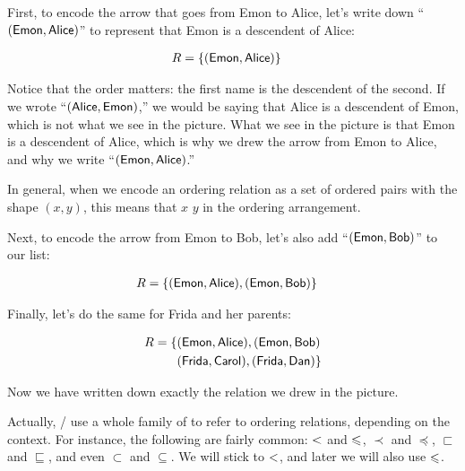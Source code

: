 \documentclass[../../../main.tex]{subfiles}
\begin{document}
First, to encode the arrow that goes from Emon to Alice, let's write down ``$(\mathsf{Emon}, \mathsf{Alice})$'' to represent that Emon is a descendent of Alice:

\begin{align*}
  R = \{ &(\mathsf{Emon}, \mathsf{Alice}) \}
\end{align*}

Notice that the order matters: the first name is the descendent of the second. If we wrote ``$(\mathsf{Alice}, \mathsf{Emon})$,'' we would be saying that Alice is a descendent of Emon, which is not what we see in the picture. What we see in the picture is that Emon is a descendent of Alice, which is why we drew the arrow from Emon to Alice, and why we write ``$(\mathsf{Emon}, \mathsf{Alice})$.''

\begin{aside}
  \begin{notation}
    In general, when we encode an ordering relation as a set of ordered pairs with the shape $(x, y)$, this means that $x$  $y$ in the ordering arrangement.
  \end{notation}
\end{aside}

Next, to encode the arrow from Emon to Bob, let's also add ``$(\mathsf{Emon}, \mathsf{Bob})$'' to our list:

\begin{align*}
  R = \{ &(\mathsf{Emon}, \mathsf{Alice}), (\mathsf{Emon}, \mathsf{Bob}) \}
\end{align*}

Finally, let's do the same for Frida and her parents:

\begin{align*}
  R = \{ &(\mathsf{Emon}, \mathsf{Alice}), (\mathsf{Emon}, \mathsf{Bob}) \\
             &(\mathsf{Frida}, \mathsf{Carol}), (\mathsf{Frida}, \mathsf{Dan}) \}
\end{align*}

Now we have written down exactly the relation we drew in the picture.

\begin{aside}
  \begin{notation}
    Actually, \mathers/ use a whole family of  to refer to ordering relations, depending on the context. For instance, the following are fairly common: $\strictorder/$ and $\order/$, $\prec$ and $\preccurlyeq$, $\sqsubset$ and $\sqsubseteq$, and even $\subset$ and $\subseteq$. We will stick to $\strictorder/$, and later we will also use $\order/$. 
  \end{notation}
\end{aside}
\end{document}
